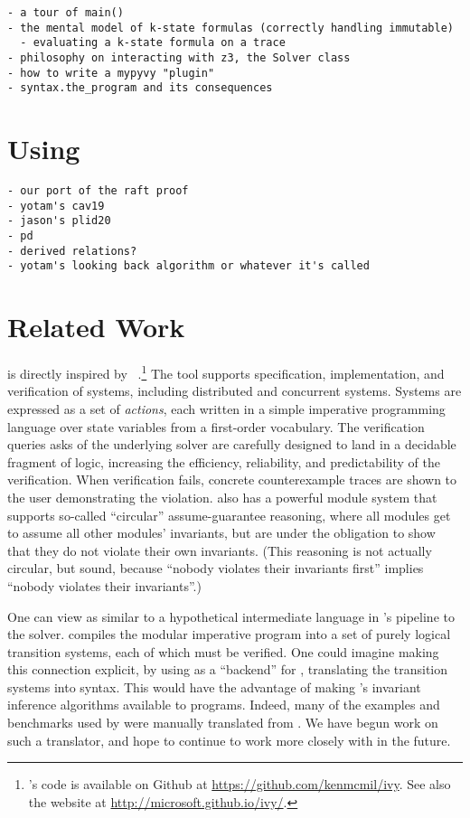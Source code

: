 \begin{verbatim}
- a tour of main()
- the mental model of k-state formulas (correctly handling immutable)
  - evaluating a k-state formula on a trace
- philosophy on interacting with z3, the Solver class
- how to write a mypyvy "plugin"
- syntax.the_program and its consequences
\end{verbatim}

\section{Using \mypyvy}

\begin{verbatim}
- our port of the raft proof
- yotam's cav19
- jason's plid20
- pd
- derived relations?
- yotam's looking back algorithm or whatever it's called
\end{verbatim}

\section{Related Work}


\mypyvy is directly inspired by \ivy~\cite{Padon-al:PLDI16}.\footnote{
  \ivy's code is available on Github at \url{https://github.com/kenmcmil/ivy}.
  See also the \ivy website at \url{http://microsoft.github.io/ivy/}.
}
%
The \ivy tool supports specification, implementation, and verification of systems,
including distributed and concurrent systems.
%
Systems are expressed as a set of \emph{actions},
each written in a simple imperative programming language
over state variables from a first-order vocabulary.
%
The verification queries \ivy asks of the underlying solver
are carefully designed to land in a decidable fragment of logic,
increasing the efficiency, reliability, and predictability
of the verification.
%
When verification fails, concrete counterexample traces
are shown to the user demonstrating the violation.
%
\ivy{} also has a powerful module system
that supports so-called ``circular'' assume-guarantee reasoning,
where all modules get to assume all other modules' invariants,
but are under the obligation to show that they do not violate
their own invariants.
%
(This reasoning is not actually circular, but sound,
because ``nobody violates their invariants first''
implies ``nobody violates their invariants''.)

One can view \mypyvy as similar to a hypothetical intermediate language
in \ivy{}'s pipeline to the solver.
%
\ivy{} compiles the modular imperative program
into a set of purely logical transition systems,
each of which must be verified.
%
One could imagine making this connection explicit,
by using \mypyvy as a ``backend'' for \ivy,
translating the transition systems into \mypyvy syntax.
%
This would have the advantage of making
\mypyvy's invariant inference algorithms available
to \ivy programs.
%
Indeed, many of the examples and benchmarks used by \mypyvy
were manually translated from \ivy.
%
We have begun work on such a translator,
and hope to continue to work more closely with \ivy in the future.


